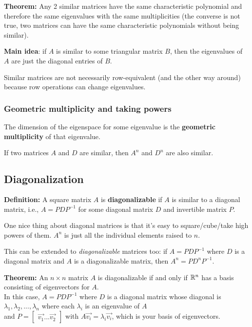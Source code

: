 \textbf{Theorem:} Any 2 similar matrices have the same characteristic polynomial and therefore the same eigenvalues with the same multiplicities (the converse is not true, two matrices can have the same characteristic polynomials without being similar).

\textbf{Main idea}: if $A$ is similar to some triangular matrix $B$, then the eigenvalues of $A$ are just the diagonal entries of $B$.

Similar matrices are not necessarily row-equivalent (and the other way around) because row operations can change eigenvalues.

\subsubsection*{Geometric multiplicity and taking powers}

The dimension of the eigenspace for some eigenvalue is the \textbf{geometric multiplicity} of that eigenvalue.

If two matrices $A$ and $D$ are similar, then $A^n$ and $D^n$ are also similar.

\subsection{Diagonalization}

\textbf{Definition:} A square matrix $A$ is \textbf{diagonalizable} if $A$ is similar to a diagonal matrix, i.e., $A = PDP^{-1}$ for some diagonal matrix $D$ and invertible matrix $P$.

One nice thing about diagonal matrices is that it's easy to square/cube/take high powers of them. $A^n$ is just all the individual elements raised to $n$.

This can be extended to \emph{diagonalizable} matrices too: if $A = PDP^{-1}$ where $D$ is a diagonal matrix and $A$ is a diagonalizable matrix, then $A^n = PD^nP^{-1}$.

\textbf{Theorem:} An $n \times n$ matrix $A$ is diagonalizable if and only if $\mathbb{R}^n$ has a basis consisting of eigenvectors for $A$.\\
In this case, $A = PDP^{-1}$ where $D$ is a diagonal matrix whose diagonal is $\lambda_1, \lambda_2, ..., \lambda_n$ where each $\lambda_i$ is an eigenvalue of $A$\\
and $P = \begin{bmatrix}\Vec{v_1} ... \Vec{v_2}\end{bmatrix}$ with $A\Vec{v_i} = \lambda_i\Vec{v_i}$, which is your basis of eigenvectors.

